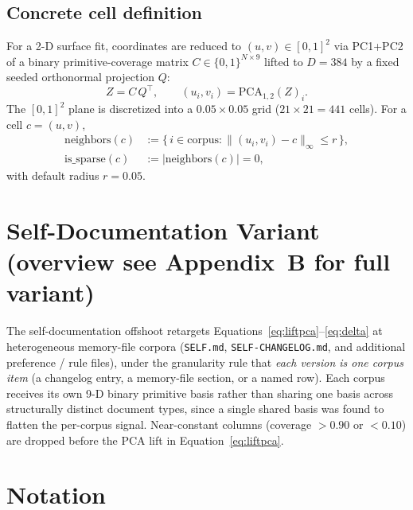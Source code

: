 \documentclass[11pt,a4paper]{article}
\begin{document}
\subsection{Concrete cell definition}

For a 2-D surface fit, coordinates are reduced to $(u, v) \in [0,1]^2$ via PC1+PC2 of a binary primitive-coverage matrix $C \in \{0,1\}^{N \times 9}$ lifted to $D = 384$ by a fixed seeded orthonormal projection $Q$:
\begin{equation}
Z = C\, Q^\top, \qquad (u_i, v_i) = \mathrm{PCA}_{1,2}(Z)_i.
\label{eq:liftpca}
\end{equation}
The $[0,1]^2$ plane is discretized into a $0.05 \times 0.05$ grid ($21 \times 21 = 441$ cells). For a cell $c = (u, v)$,
\begin{align}
\mathrm{neighbors}(c) &:= \big\{\, i \in \mathrm{corpus} : \| (u_i, v_i) - c \|_\infty \le r \,\big\}, \label{eq:neighbors}\\
\mathrm{is\_sparse}(c) &:= \big| \mathrm{neighbors}(c) \big| = 0, \label{eq:sparse}
\end{align}
with default radius $r = 0.05$.

\section{Self-Documentation Variant (overview \textemdash{} see Appendix~B for full variant)}
\label{sec:self}

The self-documentation offshoot retargets Equations~\ref{eq:liftpca}--\ref{eq:delta} at heterogeneous memory-file corpora (\texttt{SELF.md}, \texttt{SELF-CHANGELOG.md}, and additional preference / rule files), under the granularity rule that \emph{each version is one corpus item} (a changelog entry, a memory-file section, or a named row). Each corpus receives its own 9-D binary primitive basis rather than sharing one basis across structurally distinct document types, since a single shared basis was found to flatten the per-corpus signal. Near-constant columns (coverage $> 0.90$ or $< 0.10$) are dropped before the PCA lift in Equation~\ref{eq:liftpca}.

\section{Notation}
\end{document}
